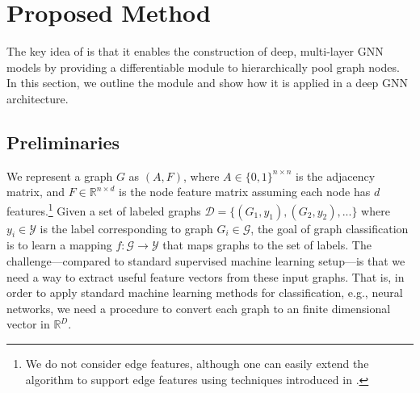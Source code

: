 \section{Proposed Method}
\label{sec:proposed}

The key idea of \name is that it enables the construction of deep, multi-layer GNN models by providing a differentiable module to hierarchically pool graph nodes. 
In this section, we outline the \name module and show how it is applied in a deep GNN architecture.


\subsection{Preliminaries}
\label{sec:setting}

We represent a graph $G$ as $(A,F)$, where $A\in \{0, 1\}^{n\times n}$ is the adjacency matrix, and $F \in \mathbb{R}^{n\times d}$ is the node feature matrix assuming each node has $d$ features.\footnote{We do not consider edge features, although one can easily extend the algorithm to support edge features using techniques introduced in \cite{simonovsky2017dynamic}.}
Given a set of labeled graphs $\mathcal{D}=\{(G_1,y_1),(G_2,y_2),...\}$ where $y_i \in \mathcal{Y}$ is the label corresponding to graph $G_i \in \mathcal{G}$, the goal of graph classification is to learn a mapping $f : \mathcal{G} \to \mathcal{Y}$ that maps graphs to the set of labels. 
The challenge---compared to standard supervised machine learning setup---is that we need a way to extract useful feature vectors from these input graphs.
That is, in order to apply standard machine learning methods for classification, e.g., neural networks, we need a procedure to convert each graph to an finite dimensional vector in $\mathbb{R}^D$.



